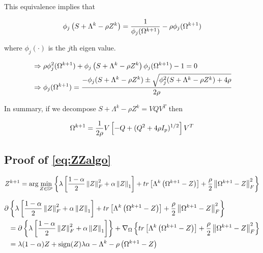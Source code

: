 \documentclass[11pt,]{report}
\begin{document}
This equivalence implies that

\begin{equation}
\phi_{j}\left( S + \Lambda^{k} - \rho Z^{k} \right) = \frac{1}{\phi_{j}(\Omega^{k + 1})} - \rho\phi_{j}(\Omega^{k + 1})\notag
\end{equation}

where \(\phi_{j}(\cdot)\) is the \(j\)th eigen value.

\begin{equation}
\begin{split}
  &\Rightarrow \rho\phi_{j}^{2}(\Omega^{k + 1}) + \phi_{j}\left( S + \Lambda^{k} - \rho Z^{k} \right)\phi_{j}(\Omega^{k + 1}) - 1 = 0 \\
  &\Rightarrow \phi_{j}(\Omega^{k + 1}) = \frac{-\phi_{j}(S + \Lambda^{k} - \rho Z^{k}) \pm \sqrt{\phi_{j}^{2}(S + \Lambda^{k} - \rho Z^{k}) + 4\rho}}{2\rho}
\end{split}
\notag
\end{equation}

In summary, if we decompose \(S + \Lambda^{k} - \rho Z^{k} = VQV^{T}\) then

\begin{equation}
\Omega^{k + 1} = \frac{1}{2\rho}V\left[ -Q + (Q^{2} + 4\rho I_{p})^{1/2}\right] V^{T}
\label{eq:appendixomegaproof}\notag
\end{equation}

\hypertarget{proofZZalgo}{%
\subsection{Proof of \eqref{eq:ZZalgo}}\label{proofZZalgo}}

\begin{equation}
Z^{k + 1} = \arg\min_{Z \in \mathbb{S}^{p}}\left\{ \lambda\left[ \frac{1 - \alpha}{2}\left\| Z \right\|_{F}^{2} + \alpha\left\| Z \right\|_{1} \right] + tr\left[\Lambda^{k}\left(\Omega^{k + 1} - Z\right)\right] + \frac{\rho}{2}\left\| \Omega^{k + 1} - Z \right\|_{F}^{2} \right\}
\label{eq:appendixZZloglik}\notag
\end{equation}

\begin{equation}
\begin{split}
  \partial&\left\{ \lambda\left[ \frac{1 - \alpha}{2}\left\| Z \right\|_{F}^{2} + \alpha\left\| Z \right\|_{1} \right] + tr\left[\Lambda^{k}\left(\Omega^{k + 1} - Z\right)\right] + \frac{\rho}{2}\left\| \Omega^{k + 1} - Z \right\|_{F}^{2} \right\} \\
  &= \partial\left\{ \lambda\left[ \frac{1 - \alpha}{2}\left\| Z \right\|_{F}^{2} + \alpha\left\| Z \right\|_{1} \right] \right\} + \nabla_{\Omega}\left\{ tr\left[\Lambda^{k}\left(\Omega^{k + 1} - Z\right)\right] + \frac{\rho}{2}\left\| \Omega^{k + 1} - Z \right\|_{F}^{2} \right\} \\
  &= \lambda(1 - \alpha)Z + \mbox{sign}(Z)\lambda\alpha - \Lambda^{k} - \rho\left( \Omega^{k + 1} - Z \right)
\label{eq:appendixZZgradient}\notag
\end{split}
\end{equation}
\end{document}
